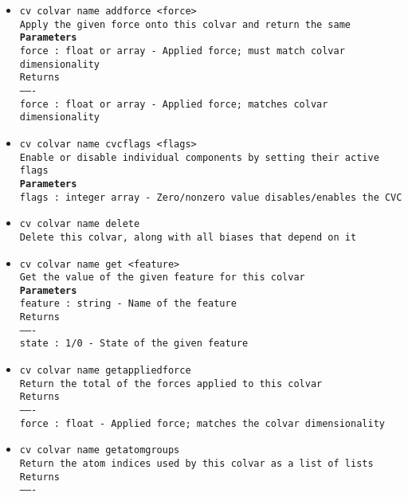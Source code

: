 \begin{itemize}
\item \texttt{cv colvar name addforce <force>}
\\
\texttt{Apply the given force onto this colvar and return the same}
\\
\texttt{\textbf{Parameters}}
\\
\texttt{force : float or array - Applied force; must match colvar dimensionality}
\\
\texttt{Returns}
\\
\texttt{-------}
\\
\texttt{force : float or array - Applied force; matches colvar dimensionality}
\item \texttt{cv colvar name cvcflags <flags>}
\\
\texttt{Enable or disable individual components by setting their active flags}
\\
\texttt{\textbf{Parameters}}
\\
\texttt{flags : integer array - Zero/nonzero value disables/enables the CVC}
\item \texttt{cv colvar name delete}
\\
\texttt{Delete this colvar, along with all biases that depend on it}
\item \texttt{cv colvar name get <feature>}
\\
\texttt{Get the value of the given feature for this colvar}
\\
\texttt{\textbf{Parameters}}
\\
\texttt{feature : string - Name of the feature}
\\
\texttt{Returns}
\\
\texttt{-------}
\\
\texttt{state : 1/0 - State of the given feature}
\item \texttt{cv colvar name getappliedforce}
\\
\texttt{Return the total of the forces applied to this colvar}
\\
\texttt{Returns}
\\
\texttt{-------}
\\
\texttt{force : float - Applied force; matches the colvar dimensionality}
\item \texttt{cv colvar name getatomgroups}
\\
\texttt{Return the atom indices used by this colvar as a list of lists}
\\
\texttt{Returns}
\\
\texttt{-------}
\\

\end{itemize}

